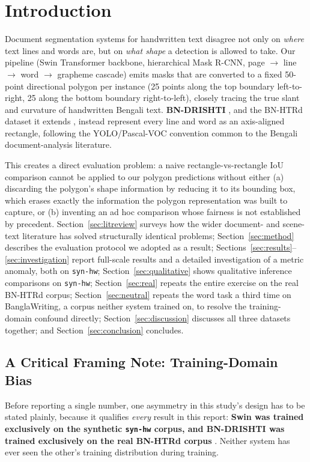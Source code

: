 \documentclass[11pt]{article}
\newcommand{\swin}{\textbf{Swin}}
\newcommand{\bnd}{\textbf{BN-DRISHTI}}
\begin{document}
\section{Introduction}

Document segmentation systems for handwritten text disagree not only on \emph{where}
text lines and words are, but on \emph{what shape} a detection is allowed to take.
Our pipeline (Swin Transformer backbone, hierarchical Mask R-CNN, page $\to$ line
$\to$ word $\to$ grapheme cascade) emits masks that are converted to a fixed 50-point
directional polygon per instance (25 points along the top boundary left-to-right, 25
along the bottom boundary right-to-left), closely tracing the true slant and curvature
of handwritten Bengali text. \bnd{} \cite{jubaer2023bndrishti}, and the BN-HTRd dataset
it extends \cite{rahman2022bnhtrd}, instead represent every line and word as an
axis-aligned rectangle, following the YOLO/Pascal-VOC convention common to the Bengali
document-analysis literature.

This creates a direct evaluation problem: a naive rectangle-vs-rectangle IoU comparison
cannot be applied to our polygon predictions without either (a) discarding the polygon's
shape information by reducing it to its bounding box, which erases exactly the
information the polygon representation was built to capture, or (b) inventing an ad hoc
comparison whose fairness is not established by precedent. Section~\ref{sec:litreview}
surveys how the wider document- and scene-text literature has solved structurally
identical problems; Section~\ref{sec:method} describes the evaluation protocol we
adopted as a result; Sections~\ref{sec:results}--\ref{sec:investigation} report
full-scale results and a detailed investigation of a metric anomaly, both on
\texttt{syn-hw}; Section~\ref{sec:qualitative} shows qualitative inference comparisons
on \texttt{syn-hw}; Section~\ref{sec:real} repeats the entire exercise on the real
BN-HTRd corpus; Section~\ref{sec:neutral} repeats the word task a third time on
BanglaWriting, a corpus neither system trained on, to resolve the training-domain
confound directly; Section~\ref{sec:discussion} discusses all three datasets together;
and Section~\ref{sec:conclusion} concludes.

\subsection{A Critical Framing Note: Training-Domain Bias}
\label{sec:trainingbias}

Before reporting a single number, one asymmetry in this study's design has to be stated
plainly, because it qualifies \emph{every} result in this report: \textbf{\swin{} was
trained exclusively on the synthetic \texttt{syn-hw} corpus, and \bnd{} was trained
exclusively on the real BN-HTRd corpus} \cite{jubaer2023bndrishti,rahman2022bnhtrd}.
Neither system has ever seen the other's training distribution during training.
\end{document}
